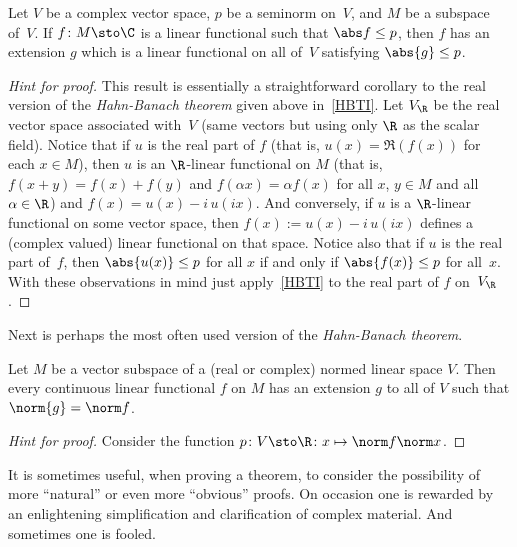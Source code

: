 \begin{thm}\label{HBTII} Let $V$ be a complex vector space, $p$ be a seminorm on~$V$, and $M$ be a subspace of~$V$.
If $f\colon M \sto \C$ is a linear functional such that $\abs f \le p$, then $f$ has an extension $g$ which is a linear functional
on all of~$V$ satisfying $\abs{g} \le p$.
\end{thm}

\begin{proof}[\emph{Hint for proof}] This result is essentially a straightforward corollary to the real version of the
\emph{Hahn-Banach theorem} given above in~\ref{HBTI}.  Let $V_{\R}$ be the real vector space associated with~$V$ (same vectors
but using only $\R$ as the scalar field).  Notice that if $u$ is the real part of $f$ (that is,
$u(x) = \Re(f(x))$ for each $x \in M$), then $u$ is an $\R$-linear functional on $M$ (that is, $f(x + y) = f(x) + f(y)$ and $f(\alpha x) = \alpha f(x)$
for all $x$, $y \in M$ and all $\alpha \in \R$) and $f(x) = u(x) - i\,u(ix)$.  And conversely, if $u$ is a $\R$-linear functional on some vector space,
then $f(x) := u(x) - i\,u(ix)$ defines a (complex valued) linear functional on that space.  Notice also that if $u$ is the real part of~$f$,
then $\abs{u(x)} \le p$ for all $x$ if and only if $\abs{f(x)} \le p$ for all~$x$.  With these observations in mind just apply~\ref{HBTI}
to the real part of $f$ on~$V_\R$.  \ns
\end{proof}

Next is perhaps the most often used version of the \emph{Hahn-Banach theorem}.

\begin{thm}\label{HBTIII} Let $M$ be a vector subspace of a (real or
complex) normed linear space $V$. Then every continuous linear functional $f$ on $M$ has
an extension $g$ to all of $V$ such that $\norm{g} = \norm f$.
\end{thm}

\begin{proof}[\emph{Hint for proof}] Consider the function $p\colon V \sto \R \colon x \mapsto \norm f \norm x$.  \ns
\end{proof}

It is sometimes useful, when proving a theorem, to consider the possibility of more ``natural'' or even  more ``obvious'' proofs.
On occasion one is rewarded by an enlightening simplification and clarification of complex material.  And sometimes one is fooled.

